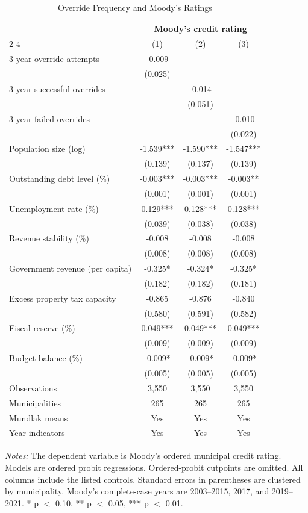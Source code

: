 \begin{table}[!htbp]
\centering
\caption{Override Frequency and Moody's Ratings}
\label{tab:northeast_moodys_frequency}
\small
\begin{tabular}{lccc}
\toprule
 & \multicolumn{3}{c}{Moody's credit rating} \\
\cmidrule(lr){2-4}
 & (1) & (2) & (3) \\
\midrule
3-year override attempts & -0.009 &  &  \\
 & (0.025) &  &  \\
3-year successful overrides &  & -0.014 &  \\
 &  & (0.051) &  \\
3-year failed overrides &  &  & -0.010 \\
 &  &  & (0.022) \\
Population size (log) & -1.539*** & -1.590*** & -1.547*** \\
 & (0.139) & (0.137) & (0.139) \\
Outstanding debt level (\%) & -0.003*** & -0.003*** & -0.003** \\
 & (0.001) & (0.001) & (0.001) \\
Unemployment rate (\%) & 0.129*** & 0.128*** & 0.128*** \\
 & (0.039) & (0.038) & (0.038) \\
Revenue stability (\%) & -0.008 & -0.008 & -0.008 \\
 & (0.008) & (0.008) & (0.008) \\
Government revenue (per capita) & -0.325* & -0.324* & -0.325* \\
 & (0.182) & (0.182) & (0.181) \\
Excess property tax capacity & -0.865 & -0.876 & -0.840 \\
 & (0.580) & (0.591) & (0.582) \\
Fiscal reserve (\%) & 0.049*** & 0.049*** & 0.049*** \\
 & (0.009) & (0.009) & (0.009) \\
Budget balance (\%) & -0.009* & -0.009* & -0.009* \\
 & (0.005) & (0.005) & (0.005) \\
\midrule
Observations & 3,550 & 3,550 & 3,550 \\
Municipalities & 265 & 265 & 265 \\
Mundlak means & Yes & Yes & Yes \\
Year indicators & Yes & Yes & Yes \\
\bottomrule
\end{tabular}
\vspace{0.05in}
\begin{minipage}{0.96\textwidth}\footnotesize\emph{Notes:} The dependent variable is Moody's ordered municipal credit rating. Models are ordered probit regressions. Ordered-probit cutpoints are omitted. All columns include the listed controls. Standard errors in parentheses are clustered by municipality. Moody's complete-case years are 2003--2015, 2017, and 2019--2021. * p $<$ 0.10, ** p $<$ 0.05, *** p $<$ 0.01.\end{minipage}
\end{table}

